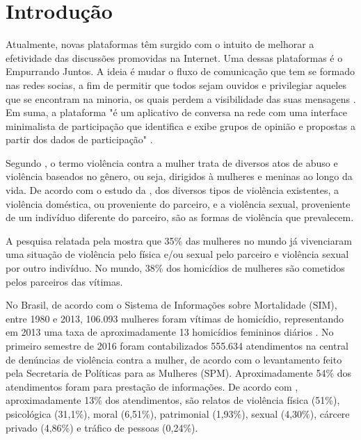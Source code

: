 \chapter[Introdução]{Introdução} \label{cap:introducao}

Atualmente, novas plataformas têm surgido com o intuito de melhorar a efetividade das discussões promovidas na Internet. 
Uma dessas plataformas é o Empurrando Juntos. A ideia é mudar o fluxo de comunicação que tem se formado nas redes socias, 
a fim de permitir que todos sejam ouvidos e privilegiar aqueles que se encontram na minoria, 
os quais perdem a visibilidade das suas mensagens \cite{empurrandojuntos}. 
Em suma, a plataforma "é um aplicativo de conversa na rede com uma interface minimalista de participação que identifica e 
exibe grupos de opinião e propostas a partir dos dados de participação" \cite{empurrandojuntos}.

Segundo , o termo violência contra a mulher trata de
diversos atos de abuso e violência baseados no gênero, ou seja, dirigidos à mulheres e meninas ao longo da vida.
De acordo com o estudo da , dos diversos tipos de violência existentes, a violência doméstica, ou proveniente do parceiro,
e a violência sexual, proveniente de um indivíduo diferente do parceiro, são as formas de violência que prevalecem.

A pesquisa relatada pela  mostra que 35\% das mulheres no mundo já vivenciaram uma situação
de violência pelo física e/ou sexual pelo parceiro e violência sexual por outro indivíduo. No mundo, 38\% dos homicídios de mulheres são cometidos pelos parceiros das vítimas.

No Brasil, de acordo com o Sistema de Informações sobre Mortalidade (SIM), entre 1980 e 2013, 106.093 mulheres foram vítimas de homicídio, representando em 2013 uma taxa de aproximadamente 13 homicídios femininos
diários \cite{mapa_violencia_2015}. 
No primeiro semestre de 2016 foram contabilizados 555.634 atendimentos na central de denúncias 
de violência contra a mulher, de acordo com o levantamento feito pela Secretaria de Políticas para as Mulheres (SPM). 
Aproximadamente 54\% dos atendimentos foram para prestação de informações. De acordo com \cite{portal_180}, aproximadamente 13\% dos atendimentos, são relatos de violência física (51\%), psicológica (31,1\%), moral (6,51\%), patrimonial (1,93\%), sexual (4,30\%), cárcere privado (4,86\%) e tráfico de pessoas (0,24\%).

